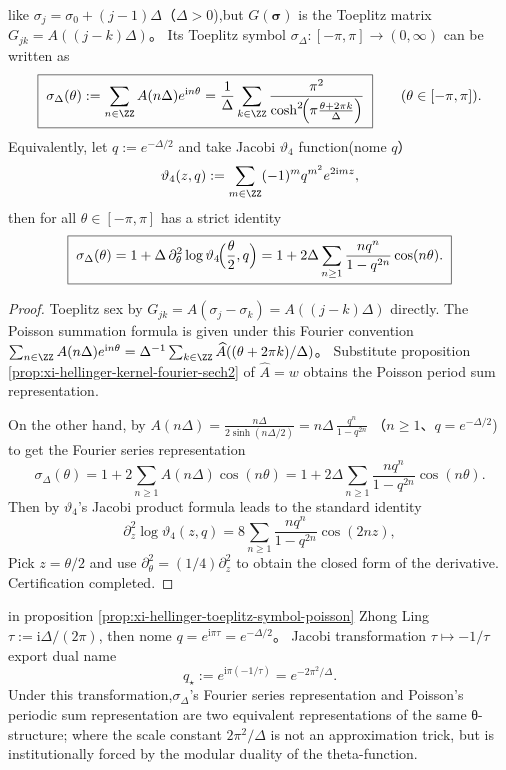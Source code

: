 \begin{proposition}\label{prop:xi-hellinger-toeplitz-symbol-poisson}
like \(\sigma_j=\sigma_0+(j-1)\Delta\)（\(\Delta>0\)),but \(G(\boldsymbol{\sigma})\) is the Toeplitz matrix
\(
G_{jk}=A((j-k)\Delta)
\)。
Its Toeplitz symbol \(\sigma_\Delta:[-\pi,\pi]\to(0,\infty)\) can be written as
\[
\boxed{\;
\sigma_\Delta(\theta)
:=\sum_{n\in\ZZ}A(n\Delta)e^{\mathrm{i}n\theta}
=\frac{1}{\Delta}\sum_{k\in\ZZ}\frac{\pi^{2}}{\cosh^{2}\!\Bigl(\pi\frac{\theta+2\pi k}{\Delta}\Bigr)}\;}
\qquad(\theta\in[-\pi,\pi]).
\]
Equivalently, let \(q:=e^{-\Delta/2}\) and take Jacobi \(\vartheta_4\) function(nome \(q\)）
\[
\vartheta_4(z,q):=\sum_{m\in\ZZ}(-1)^m q^{m^2}e^{2\mathrm{i}mz},
\]
then for all \(\theta\in[-\pi,\pi]\) has a strict identity
\[
\boxed{\;
\sigma_\Delta(\theta)
=1+\Delta\,\partial_\theta^{2}\log\vartheta_4\!\Bigl(\frac{\theta}{2},q\Bigr)
=1+2\Delta\sum_{n\ge 1}\frac{nq^{n}}{1-q^{2n}}\cos(n\theta).\;}
\]
\end{proposition}
\begin{proof}
Toeplitz sex by \(G_{jk}=A(\sigma_j-\sigma_k)=A((j-k)\Delta)\) directly.
The Poisson summation formula is given under this Fourier convention
\(
\sum_{n\in\ZZ}A(n\Delta)e^{\mathrm{i}n\theta}
=\Delta^{-1}\sum_{k\in\ZZ}\widehat A((\theta+2\pi k)/\Delta)
\)。
Substitute proposition \ref{prop:xi-hellinger-kernel-fourier-sech2} of \(\widehat A=w\) obtains the Poisson period sum representation.
\par
On the other hand, by
\(
A(n\Delta)=\frac{n\Delta}{2\sinh(n\Delta/2)}
=n\Delta\,\frac{q^n}{1-q^{2n}}
\)
（\(n\ge 1\)、\(q=e^{-\Delta/2}\)) to get the Fourier series representation
\[
\sigma_\Delta(\theta)=1+2\sum_{n\ge 1}A(n\Delta)\cos(n\theta)
=1+2\Delta\sum_{n\ge 1}\frac{nq^{n}}{1-q^{2n}}\cos(n\theta).
\]
Then by \(\vartheta_4\)'s Jacobi product formula leads to the standard identity
\[
\partial_z^{2}\log\vartheta_4(z,q)
=8\sum_{n\ge 1}\frac{nq^{n}}{1-q^{2n}}\cos(2nz),
\]
Pick \(z=\theta/2\) and use \(\partial_\theta^{2}=(1/4)\partial_z^{2}\) to obtain the closed form of the derivative. Certification completed.
\end{proof}

\begin{remark}\label{rem:xi-hellinger-toeplitz-modular-duality-scale}
in proposition \ref{prop:xi-hellinger-toeplitz-symbol-poisson} Zhong Ling \(\tau:=\mathrm{i}\Delta/(2\pi)\), then nome \(q=e^{\mathrm{i}\pi\tau}=e^{-\Delta/2}\)。
Jacobi transformation \(\tau\mapsto -1/\tau\) export dual name
\[
q_\star:=e^{\mathrm{i}\pi(-1/\tau)}=e^{-2\pi^{2}/\Delta}.
\]
Under this transformation,\(\sigma_\Delta\)'s Fourier series representation and Poisson's periodic sum representation are two equivalent representations of the same θ-structure;
where the scale constant \(2\pi^{2}/\Delta\) is not an approximation trick, but is institutionally forced by the modular duality of the theta-function.
\end{remark}

